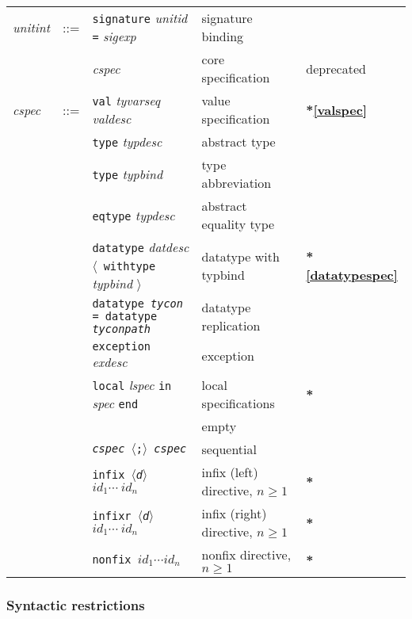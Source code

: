 \documentclass[fleqn]{article}
\newcommand{\x}[1][]{{\bf{*}#1}}
\newcommand{\la}{$\langle$}
\newcommand{\ra}{$\rangle$}
\begin{document}
\begin{tabular}{lllll}
{\it unitint\/} & ::= 
  & {\tt signature} {\it unitid} {\tt =}  {\it sigexp\/} 
                                                & signature binding \\
& & {\it cspec\/}                               & core specification & deprecated \\[2ex]

{\it cspec} & ::= & {\tt val}  {\it tyvarseq\/} {\it valdesc}    & value specification & \x[\ref{valspec}] \\ 
& & {\tt type} {\it typdesc}                    & abstract type \\
& & {\tt type} {\it typbind}            & type abbreviation \\
& & {\tt eqtype} {\it typdesc}          & abstract equality type\\
& & {\tt datatype} {\it datdesc} \la\ {\tt withtype} {\it typbind\/} \ra\ &
                                          datatype with typbind & \x[\ref{datatypespec}]\\
& & {\tt datatype {\it tycon\/} = datatype {\it tyconpath\/}}
& datatype replication\\
& & {\tt exception} {\it exdesc}        & exception\\
& & {\tt local} {\it lspec} {\tt in} {\it spec} {\tt end}
                                        & local specifications & \x\\
& &                                     & empty\\
& & {\tt {\it cspec} $\langle${;}$\rangle$ {\it cspec}} & sequential\\
& & {\tt infix \la{\it d\/}\ra\ $id_1 \cdots\ id_n$} & infix (left)
  directive, $n\geq 1$ & \x \\
& & {\tt infixr \la{\it d\/}\ra\ $id_1 \cdots\ id_n$} & infix (right)
  directive, $n\geq 1$ & \x \\
& & {\tt nonfix $id_1 \cdots id_n$} & nonfix directive, $n\geq 1$ & \x \\[2ex]
\end{tabular}

\subsubsection*{Syntactic restrictions}
\end{document}
